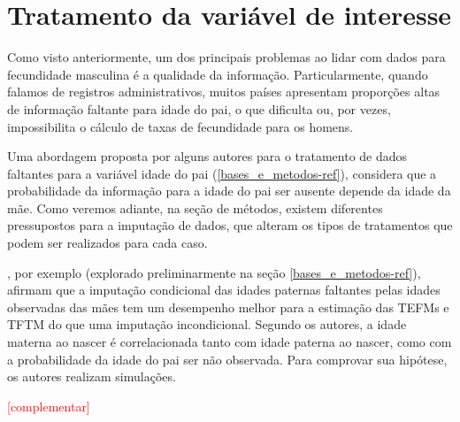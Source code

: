 


\section{Tratamento da variável de interesse}

Como visto anteriormente, um dos principais problemas ao lidar com dados para fecundidade masculina é a qualidade da informação. Particularmente, quando falamos de registros administrativos, muitos países apresentam proporções altas de informação faltante para idade do pai, o que dificulta ou, por vezes, impossibilita o cálculo de taxas de fecundidade para os homens.

Uma abordagem proposta por alguns autores para o tratamento de dados faltantes para a variável idade do pai (\ref{bases_e_metodos-ref}), considera que a probabilidade da informação para a idade do pai ser ausente depende da idade da mãe. Como veremos adiante, na seção de métodos, existem diferentes pressupostos para a imputação de dados, que alteram os tipos de tratamentos que podem ser realizados para cada caso.  

, por exemplo (explorado preliminarmente na seção \ref{bases_e_metodos-ref}), afirmam que a imputação condicional das idades paternas faltantes pelas idades observadas das mães tem um desempenho melhor para a estimação das TEFMs e TFTM do que uma imputação incondicional. Segundo os autores, a idade materna ao nascer é correlacionada tanto com idade paterna ao nascer, como com a probabilidade da idade do pai ser não observada. Para comprovar sua hipótese, os autores realizam simulações. 



\textcolor{red}{[complementar]}










